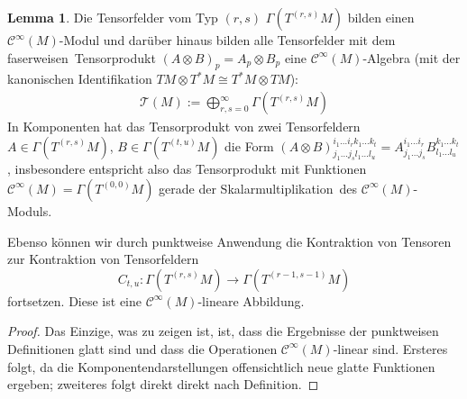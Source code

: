 \documentclass[a4paper]{scrbook}
\numberwithin{equation}{chapter}
\newcommand{\sC}{\mathcal{C}^{\infty}}
\theoremstyle{definition}
\newtheorem{lemma}[defn]{Lemma}
\begin{document}
		\begin{lemma}
			Die Tensorfelder vom Typ $(r,s)$ $\Gamma(T^{(r,s)}M)$ bilden einen $\sC(M)$-Modul und darüber hinaus bilden alle Tensorfelder mit dem \glqq faserweisen\grqq\ Tensorprodukt $(A\otimes B)_p=A_p\otimes B_p$ eine $\sC(M)$-Algebra (mit der kanonischen Identifikation $TM\otimes T^*M\cong T^*M\otimes TM$):
			\begin{align*}
				\mathcal{T}(M):=\bigoplus_{r,s=0}^{\infty}\Gamma(T^{(r,s)}M)
			\end{align*}
			In Komponenten hat das Tensorprodukt von zwei Tensorfeldern $A \in \Gamma(T^{(r,s)}M)$, $B \in \Gamma(T^{(t,u)}M)$ die Form $(A\otimes B)^{i_1 \dots i_r k_1 \dots k_t}_{j_1 \dots j_s l_1 \dots l_u} = A^{i_1 \dots i_r}_{j_1 \dots j_s} B^{k_1 \dots k_t}_{l_1 \dots l_u}$, insbesondere entspricht also das Tensorprodukt mit Funktionen $\sC(M)=\Gamma(T^{(0,0)}M)$ gerade der \glqq Skalarmultiplikation\grqq\ des $\sC(M)$-Moduls.
			
			Ebenso können wir durch punktweise Anwendung die Kontraktion von Tensoren zur Kontraktion von Tensorfeldern
			\[C_{t,u}\colon \Gamma(T^{(r,s)}M) \to \Gamma(T^{(r-1,s-1)}M)\]
			fortsetzen. Diese ist eine $\sC(M)$-lineare Abbildung.
			
			\begin{proof}
				Das Einzige, was zu zeigen ist, ist, dass die Ergebnisse der punktweisen Definitionen glatt sind und dass die Operationen $\sC(M)$-linear sind. Ersteres folgt, da die Komponentendarstellungen offensichtlich neue glatte Funktionen ergeben; zweiteres folgt direkt direkt nach Definition.
			\end{proof}
		\end{lemma}
\end{document}
